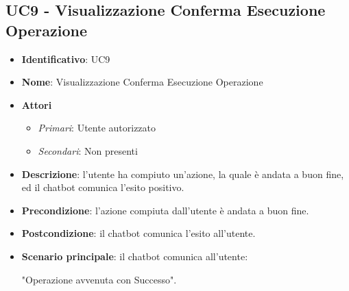 \subsection{UC9 - Visualizzazione Conferma Esecuzione Operazione}
\begin{itemize}
	\item \textbf{Identificativo}: UC9
	\item \textbf{Nome}: Visualizzazione Conferma Esecuzione Operazione
	\item \textbf{Attori}
	\begin{itemize} 
		\item \textit{Primari}: Utente autorizzato
	    \item \textit{Secondari}: Non presenti
	\end{itemize}
	\item \textbf{Descrizione}: l'utente ha compiuto un'azione, la quale è andata a buon fine, ed il chatbot comunica l'esito positivo.
	\item \textbf{Precondizione}: l'azione compiuta dall'utente è andata a buon fine.
	\item \textbf{Postcondizione}: il chatbot comunica l'esito all'utente.
	\item \textbf{Scenario principale}: il chatbot comunica all'utente: \begin{center}
		"Operazione avvenuta con Successo".
	\end{center}
\end{itemize}


